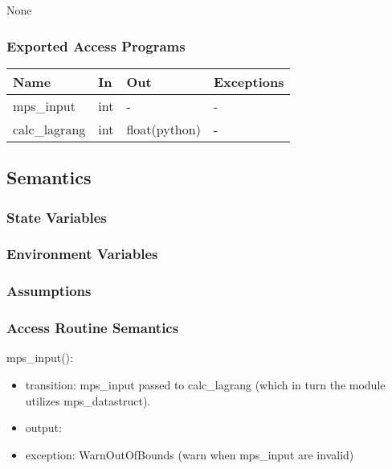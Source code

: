 \documentclass[12pt, titlepage]{article}
\begin{document}
None

\subsubsection{Exported Access Programs}

\begin{center}
\begin{tabular}{p{2cm} p{4cm} p{4cm} p{2cm}}
\hline
\textbf{Name} & \textbf{In} & \textbf{Out} & \textbf{Exceptions} \\
\hline
mps\_input  & int & - & - \\
calc\_lagrang & int & float(python) & - \\
\hline
\end{tabular}
\end{center}

\subsection{Semantics}

\subsubsection{State Variables}

\subsubsection{Environment Variables}


\subsubsection{Assumptions}


\subsubsection{Access Routine Semantics}

\noindent mps\_input():
\begin{itemize}
\item transition: mps\_input passed to calc\_lagrang (which in turn the module 
utilizes mps\_datastruct).
\item output:  
\item exception: WarnOutOfBounds (warn when mps\_input are invalid) 
\end{itemize}
\end{document}
